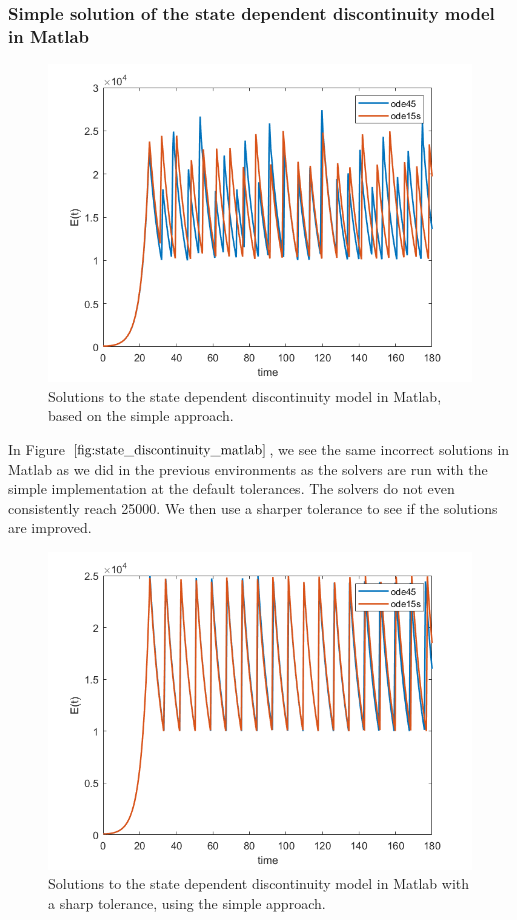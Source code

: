 \subsubsection{Simple solution of the state dependent discontinuity model in Matlab}
\begin{figure}[H]
\centering
\includegraphics[width=0.7\linewidth]{./figures/state_discontinuity_matlab}
\caption{Solutions to the state dependent discontinuity model in Matlab, based on the simple approach.}
\label{fig:state_discontinuity_matlab}
\end{figure}
In Figure $\ref{fig:state_discontinuity_matlab}$, we see the same incorrect solutions in Matlab as we did in the previous environments as the solvers are run with the simple implementation at the default tolerances. The solvers do not even consistently reach 25000. We then use a sharper tolerance to see if the solutions are improved.

\begin{figure}[h]
\centering
\includegraphics[width=0.7\linewidth]{./figures/state_discontinuity_sharp_matlab}
\caption{Solutions to the state dependent discontinuity model in Matlab with a sharp tolerance, using the simple approach.}
\label{fig:state_discontinuity_sharp_matlab}
\end{figure}

